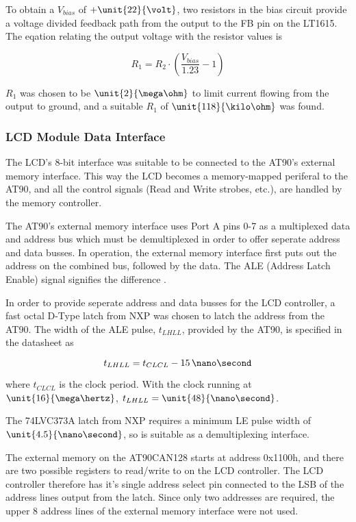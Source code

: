 To obtain a $V_{bias}$ of $+\unit{22}{\volt}$, two resistors in the bias circuit provide a voltage divided feedback path from the output to the FB pin on the LT1615. The eqation relating the output voltage with the resistor values is

\begin{equation}
R_{1}=R_{2}\cdot\left(\frac{V_{bias}}{1.23}-1\right)
\end{equation}

 $R_{1}$ was chosen to be $\unit{2}{\mega\ohm}$ to limit current flowing from the output to ground, and a suitable $R_{1}$ of $\unit{118}{\kilo\ohm}$ was found.


\subsubsection{LCD Module Data Interface\label{sec:lcd_module_data_interface}}

The LCD's 8-bit interface was suitable to be connected to the AT90's external memory interface. This way the LCD becomes a memory-mapped periferal to the AT90, and all the control signals (Read and Write strobes, etc.), are handled by the memory controller.

The AT90's external memory interface uses Port A pins 0-7 as a multiplexed data and address bus which must be demultiplexed in order to offer seperate address and data busses. In operation, the external memory interface first puts out the address on the combined bus, followed by the data. The ALE (Address Latch Enable) signal signifies the difference \cite{AT90CAN}.

In order to provide seperate address and data busses for the LCD controller, a fast octal D-Type latch from NXP was chosen to latch the address from the AT90. The width of the ALE pulse, $t_{LHLL}$, provided by the AT90, is specified in the datasheet as

\begin{equation}
t_{LHLL}=t_{CLCL}-15\, \nano\second
\end{equation}

 where $t_{CLCL}$ is the clock period. With the clock running at $\unit{16}{\mega\hertz}$, $t_{LHLL}=\unit{48}{\nano\second}$.

The 74LVC373A latch from NXP requires a minimum LE pulse width of $\unit{4.5}{\nano\second}$, so is suitable as a demultiplexing interface.

The external memory on the AT90CAN128 starts at address 0x1100h, and there are two possible registers to read/write to on the LCD controller. The LCD controller therefore has it's single address select pin connected to the LSB of the address lines output from the latch. Since only two addresses are required, the upper 8 address lines of the external memory interface were not used.

